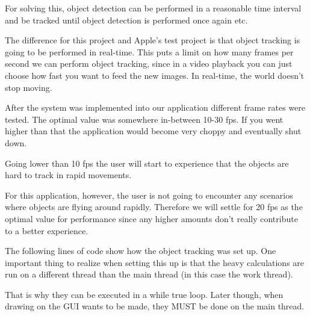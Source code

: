 For solving this, object detection can be performed in a reasonable time interval and be tracked until object detection is performed once again etc.

\cite{ObjectTracking}
The difference for this project and Apple's test project is that object tracking is going to be performed in real-time. This puts a limit on how many frames per second we can perform object tracking, since in a video playback you can just choose how fast you want to feed the new images. In real-time, the world doesn't stop moving.

After the system was implemented into our application different frame rates were tested. The optimal value was somewhere in-between 10-30 fps. If you went higher than that the application would become very choppy and eventually shut down.

Going lower than 10 fps the user will start to experience that the objects are hard to track in rapid movements.

For this application, however, the user is not going to encounter any scenarios where objects are flying around rapidly. Therefore we will settle for 20 fps as the optimal value for performance since any higher amounts don't really contribute to a better experience.

The following lines of code show how the object tracking was set up. One important thing to realize when setting this up is that the heavy calculations are run on a different thread than the main thread (in this case the work thread). 

That is why they can be executed in a while true loop. Later though, when drawing on the GUI wants to be made, they MUST be done on the main thread.

